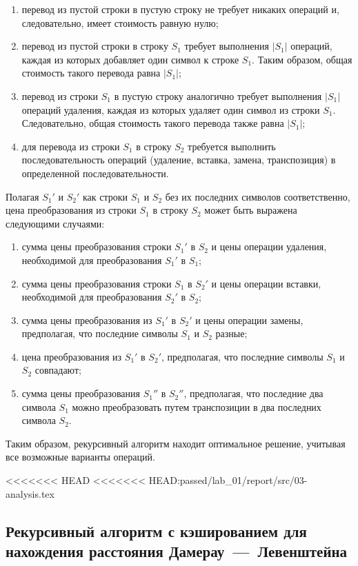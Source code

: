 \begin{enumerate}[label=\arabic*)]
	\item перевод из пустой строки в пустую строку не требует никаких операций и, следовательно, имеет стоимость равную нулю;
	\item перевод из пустой строки в строку $S_{1}$ требует выполнения $|S_{1}|$ операций, каждая из которых добавляет один символ к строке $S_{1}$. Таким образом, общая стоимость такого перевода равна $|S_{1}|$;
	\item перевод из строки $S_{1}$ в пустую строку аналогично требует выполнения $|S_{1}|$ операций удаления, каждая из которых удаляет один символ из строки $S_{1}$. Следовательно, общая стоимость такого перевода также равна $|S_{1}|$;
	\item для перевода из строки $S_{1}$ в строку $S_{2}$ требуется выполнить последовательность операций (удаление, вставка, замена, транспозиция) в определенной последовательности.
\end{enumerate}

Полагая $S_{1}'$ и $S_{2}'$ как строки $S_{1}$ и $S_{2}$ без их последних символов соответственно, цена преобразования из строки $S_{1}$ в строку $S_{2}$ может быть выражена следующими случаями:
\begin{enumerate}
   \item сумма цены преобразования строки $S_{1}'$ в $S_{2}$ и цены операции удаления, необходимой для преобразования $S_{1}'$ в $S_{1}$;
   \item сумма цены преобразования строки $S_{1}$ в $S_{2}'$ и цены операции вставки, необходимой для преобразования $S_{2}'$ в $S_{2}$;
   \item сумма цены преобразования из $S_{1}'$ в $S_{2}'$ и цены операции замены, предполагая, что последние символы $S_{1}$ и $S_{2}$ разные;
   \item цена преобразования из $S_{1}'$ в $S_{2}'$, предполагая, что последние символы $S_{1}$ и $S_{2}$ совпадают;
   \item сумма цены преобразования $S_{1}''$ в $S_{2}''$, предполагая, что последние два символа $S_{1}$ можно преобразовать путем транспозиции в два последних символа $S_{2}$.
\end{enumerate}

Таким образом, рекурсивный алгоритм находит оптимальное решение, учитывая все возможные варианты операций.

<<<<<<< HEAD
<<<<<<< HEAD:passed/lab_01/report/src/03-analysis.tex
\subsection{Рекурсивный алгоритм с кэшированием для нахождения расстояния Дамерау~---~Левенштейна}


